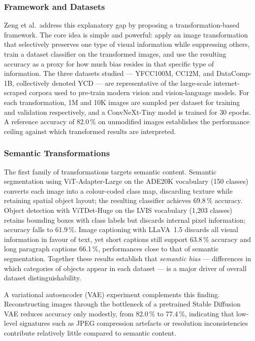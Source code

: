 \subsubsection*{Framework and Datasets}

Zeng et al.\ address this explanatory gap by proposing a transformation-based framework.  The
core idea is simple and powerful: apply an image transformation that selectively preserves
one type of visual information while suppressing others, train a dataset classifier on the
transformed images, and use the resulting accuracy as a proxy for how much bias resides in
that specific type of information.  The three datasets studied --- YFCC100M, CC12M, and
DataComp-1B, collectively denoted YCD --- are representative of the large-scale
internet-scraped corpora used to pre-train modern vision and vision-language models.  For
each transformation, 1M and 10K images are sampled per dataset for training and validation
respectively, and a ConvNeXt-Tiny model is trained for 30 epochs.  A reference accuracy of
82.0\,\% on unmodified images establishes the performance ceiling against which transformed
results are interpreted.

\subsubsection*{Semantic Transformations}

The first family of transformations targets semantic content.  Semantic segmentation using
ViT-Adapter-Large on the ADE20K vocabulary (150 classes) converts each image into a
colour-coded class map, discarding texture while retaining spatial object layout; the
resulting classifier achieves 69.8\,\% accuracy.  Object detection with ViTDet-Huge on the
LVIS vocabulary (1,203 classes) retains bounding boxes with class labels but discards internal
pixel information; accuracy falls to 61.9\,\%.  Image captioning with LLaVA~1.5 discards
all visual information in favour of text, yet short captions still support 63.8\,\% accuracy
and long paragraph captions 66.1\,\%, performances close to that of semantic segmentation.
Together these results establish that \emph{semantic bias} --- differences in which categories
of objects appear in each dataset --- is a major driver of overall dataset distinguishability.

A variational autoencoder (VAE) experiment complements this finding.  Reconstructing images
through the bottleneck of a pretrained Stable Diffusion VAE reduces accuracy only modestly,
from 82.0\,\% to 77.4\,\%, indicating that low-level signatures such as JPEG compression
artefacts or resolution inconsistencies contribute relatively little compared to semantic
content.

